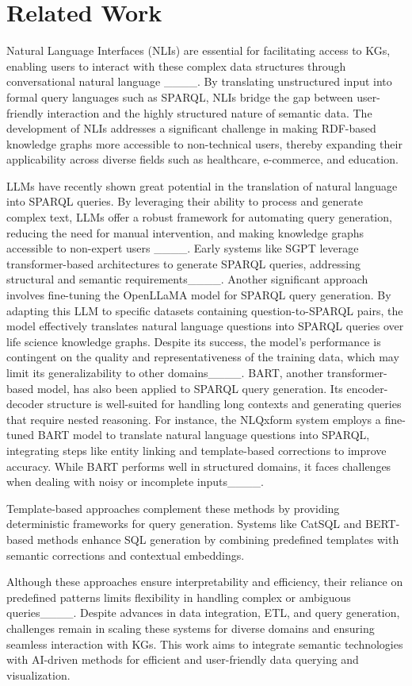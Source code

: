 \section{Related Work}
\label{sec:related}

Natural Language Interfaces (NLIs) are essential for facilitating access to KGs, enabling users to interact with these complex data structures through conversational natural language ____. By translating unstructured input into formal query languages such as SPARQL, NLIs bridge the gap
between user-friendly interaction and the highly structured nature of semantic data. The development of NLIs addresses a significant challenge
in making RDF-based knowledge graphs more accessible to non-technical
users, thereby expanding their applicability across diverse fields such as healthcare, e-commerce, and education.

LLMs have recently shown great potential in the
translation of natural language into SPARQL queries. By leveraging their
ability to process and generate complex text, LLMs offer a robust framework for automating query generation, reducing the need for manual intervention, and making knowledge graphs accessible to non-expert users ____.
Early systems like SGPT leverage transformer-based architectures to generate SPARQL queries, addressing structural and semantic requirements____.
Another significant approach involves fine-tuning the OpenLLaMA model for SPARQL query generation.
By adapting this LLM to specific datasets containing question-to-SPARQL pairs, the model effectively translates natural language questions into SPARQL
queries over life science knowledge graphs. Despite its success, the model's performance is contingent on the quality and representativeness of the training data,
which may limit its generalizability to other domains____. BART, another transformer-based model, has also been applied to SPARQL query generation.
Its encoder-decoder structure is well-suited for handling long contexts and generating queries that require nested reasoning.
For instance, the NLQxform system employs a fine-tuned BART model to translate natural language questions into SPARQL,
integrating steps like entity linking and template-based corrections to improve accuracy. While BART performs well in structured domains,
it faces challenges when dealing with noisy or incomplete inputs____. 


Template-based approaches complement these methods by providing deterministic frameworks for query generation. Systems like CatSQL and BERT-based methods enhance
SQL generation by combining predefined templates with semantic corrections and contextual embeddings.

Although these approaches ensure interpretability and efficiency, their reliance on predefined patterns limits flexibility in handling complex or ambiguous queries____. 
Despite advances in data integration, ETL, and query generation, challenges remain in scaling these systems for diverse domains and ensuring seamless
interaction with KGs. This work aims to integrate semantic technologies with AI-driven methods for efficient and user-friendly data querying and visualization.